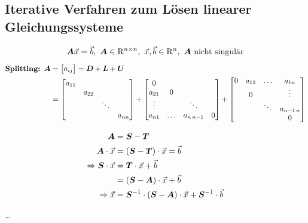 \subsection{Iterative Verfahren zum Lösen linearer Gleichungssysteme}
\[\boldsymbol {A} \vec{x} = \vec{b},\ \boldsymbol {A} \in \mathrm{R}^{n\times n},\ \vec{x},\vec{b} \in \mathrm{R}^n,\ \boldsymbol {A} \text{ nicht singulär}\]

\begin{align}
	\textbf{Splitting: } \boldsymbol {A} &= \begin{bmatrix}a_{ij}\end{bmatrix} = \boldsymbol {D} + \boldsymbol {L} + \boldsymbol {U}\\
	&= \begin{bmatrix}a_{11} & & & \\ & a_{22} & &\\ & & \ddots & \\ & & & a_{nn}\end{bmatrix} + 
	\begin{bmatrix}0 & & & \\ a_{21} & 0 & &\\ \vdots & & \ddots &  \\ a_{n1} & \ldots & a_{n\, n-1} & 0\end{bmatrix} + 
	\begin{bmatrix}0 & a_{12} & \ldots & a_{1n} \\ & 0 & & \vdots \\ & & \ddots & a_{n-1\,n} \\ & & & 0\end{bmatrix}
\end{align}

\begin{align}
	\boldsymbol {A} &= \boldsymbol {S} - \boldsymbol {T}\\
	\boldsymbol {A} \cdot \vec{x} &= \left( \boldsymbol {S} - \boldsymbol {T} \right) \cdot \vec{x} = \vec{b}\\
	\Rightarrow \boldsymbol {S} \cdot \vec{x} &= \boldsymbol {T} \cdot \vec{x} + \vec{b}\\
	&= \left( \boldsymbol {S} - \boldsymbol {A} \right) \cdot \vec{x} + \vec{b}\\
	\Rightarrow \vec{x} &= \boldsymbol {S}^{-1} \cdot \left( \boldsymbol {S} - \boldsymbol {A} \right) \cdot \vec{x} + \boldsymbol {S}^{-1} \cdot \vec{b}
\end{align}

\ldots

